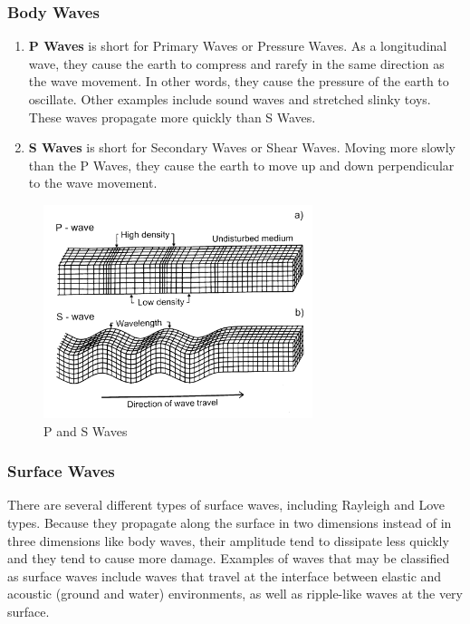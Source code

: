 \subsubsection{Body Waves}

\begin{enumerate}[leftmargin=0.5in]
	\item{\textbf{P Waves}} is short for Primary Waves or Pressure Waves. As a longitudinal wave, they cause the earth to compress and rarefy in the same direction as the wave movement. In other words, they cause the pressure of the earth to oscillate. Other examples include sound waves and stretched slinky toys. These waves propagate more quickly than S Waves.
	
	\item{\textbf{S Waves}} is short for Secondary Waves or Shear Waves. Moving more slowly than the P Waves, they cause the earth to move up and down perpendicular to the wave movement.
\end{enumerate}

\begin{figure}[ht]
	\centering
	\includegraphics[width=0.7\textwidth]{Images/waves.jpg}
	\caption{P and S Waves}
	\label{fig:PSWaves}
\end{figure}

\subsubsection{Surface Waves}

There are several different types of surface waves, including Rayleigh and Love types. Because they propagate along the surface in two dimensions instead of in three dimensions like body waves, their amplitude tend to dissipate less quickly and they tend to cause more damage. Examples of waves that may be classified as surface waves include waves that travel at the interface between elastic and acoustic (ground and water) environments, as well as ripple-like waves at the very surface.

